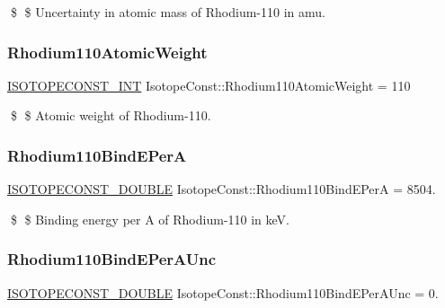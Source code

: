 \$ \$ Uncertainty in atomic mass of Rhodium-\/110 in amu. \mbox{\label{group___isotope_const-_rhodium-_rh110_ga303be1c8c6821c0a1e7cf650a5929255}} 
\subsubsection{\texorpdfstring{Rhodium110\+Atomic\+Weight}{Rhodium110AtomicWeight}}
{\footnotesize\ttfamily \mbox{\hyperlink{group___isotope_const-_macros_ga5f18360b3e99483a35c32d789e62621c}{I\+S\+O\+T\+O\+P\+E\+C\+O\+N\+S\+T\+\_\+\+I\+NT}} Isotope\+Const\+::\+Rhodium110\+Atomic\+Weight = 110}

\$ \$ Atomic weight of Rhodium-\/110. \mbox{\label{group___isotope_const-_rhodium-_rh110_ga73927c2f63bee6bb5e1268588b068079}} 
\subsubsection{\texorpdfstring{Rhodium110\+Bind\+E\+PerA}{Rhodium110BindEPerA}}
{\footnotesize\ttfamily \mbox{\hyperlink{group___isotope_const-_macros_ga8f45a7272ce02c0b4c65c44636ed719a}{I\+S\+O\+T\+O\+P\+E\+C\+O\+N\+S\+T\+\_\+\+D\+O\+U\+B\+LE}} Isotope\+Const\+::\+Rhodium110\+Bind\+E\+PerA = 8504.}

\$ \$ Binding energy per A of Rhodium-\/110 in keV. \mbox{\label{group___isotope_const-_rhodium-_rh110_ga101e8dadc0aca4c72e98ecd398ca6d71}} 
\subsubsection{\texorpdfstring{Rhodium110\+Bind\+E\+Per\+A\+Unc}{Rhodium110BindEPerAUnc}}
{\footnotesize\ttfamily \mbox{\hyperlink{group___isotope_const-_macros_ga8f45a7272ce02c0b4c65c44636ed719a}{I\+S\+O\+T\+O\+P\+E\+C\+O\+N\+S\+T\+\_\+\+D\+O\+U\+B\+LE}} Isotope\+Const\+::\+Rhodium110\+Bind\+E\+Per\+A\+Unc = 0.}

